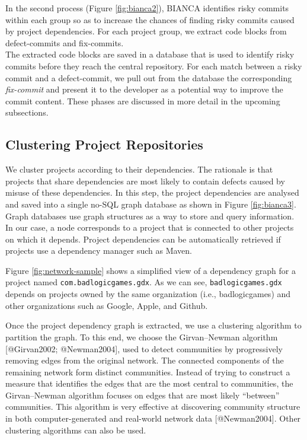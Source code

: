 In the second process (Figure \ref{fig:bianca2}), BIANCA identifies
risky commits within each group so as to increase the chances of finding
risky commits caused by project dependencies. For each project group, we
extract code blocks from defect-commits and fix-commits.\\
The extracted code blocks are saved in a database that is used to
identify risky commits before they reach the central repository. For
each match between a risky commit and a defect-commit, we pull out from
the database the corresponding \emph{fix-commit} and present it to the
developer as a potential way to improve the commit content. These phases
are discussed in more detail in the upcoming subsections.

\subsection{Clustering Project Repositories}\label{sec:clustering}

We cluster projects according to their dependencies. The rationale is
that projects that share dependencies are most likely to contain defects
caused by misuse of these dependencies. In this step, the project
dependencies are analysed and saved into a single no-SQL graph database
as shown in Figure \ref{fig:bianca3}. Graph databases use graph
structures as a way to store and query information. In our case, a node
corresponds to a project that is connected to other projects on which it
depends. Project dependencies can be automatically retrieved if projects
use a dependency manager such as Maven.

Figure \ref{fig:network-sample} shows a simplified view of a dependency
graph for a project named \texttt{com.badlogicgames.gdx}. As we can see,
\texttt{badlogicgames.gdx} depends on projects owned by the same
organization (i.e., badlogicgames) and other organizations such as
Google, Apple, and Github.



Once the project dependency graph is extracted, we use a clustering
algorithm to partition the graph. To this end, we choose the
Girvan--Newman algorithm {[}@Girvan2002; @Newman2004{]}, used to detect
communities by progressively removing edges from the original network.
The connected components of the remaining network form distinct
communities. Instead of trying to construct a measure that identifies
the edges that are the most central to communities, the Girvan--Newman
algorithm focuses on edges that are most likely ``between'' communities.
This algorithm is very effective at discovering community structure in
both computer-generated and real-world network data {[}@Newman2004{]}.
Other clustering algorithms can also be used.

